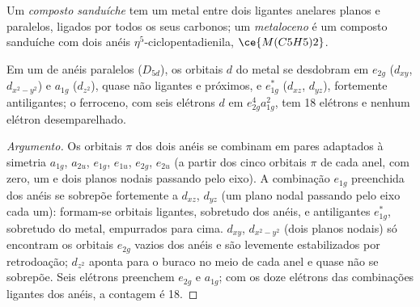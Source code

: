 \begin{definition}[Metalocenos]\label{def:b3:organometallic-bonding:metallocene}
Um \emph{composto sanduíche} tem um metal entre dois
ligantes anelares planos e paralelos, ligados por todos os seus carbonos; um
\emph{metaloceno} é um composto sanduíche com dois anéis
$\eta^5$-ciclopentadienila, $\ce{M(C5H5)2}$.
\end{definition}

\begin{proposition}\label{prop:b3:organometallic-bonding:ferrocene}
Em um  de anéis paralelos ($D_{5d}$), os orbitais $d$ do metal se desdobram em $e_{2g}$
($d_{xy}$, $d_{x^2-y^2}$) e $a_{1g}$ ($d_{z^2}$), quase não ligantes e próximos, e $e_{1g}^\ast$ ($d_{xz}$,
$d_{yz}$), fortemente antiligantes; o ferroceno, com seis elétrons $d$ em $e_{2g}^4a_{1g}^2$, tem 18
elétrons e nenhum elétron desemparelhado.
\end{proposition}

\begin{proof}[Argumento]
Os orbitais $\pi$ dos dois anéis se combinam em pares adaptados à simetria $a_{1g}$, $a_{2u}$,
$e_{1g}$, $e_{1u}$, $e_{2g}$, $e_{2u}$ (a partir dos cinco orbitais $\pi$ de cada anel, com zero, um e dois
planos nodais passando pelo eixo). A combinação $e_{1g}$ preenchida dos anéis se sobrepõe
fortemente a $d_{xz}$, $d_{yz}$ (um plano nodal passando pelo eixo cada um): formam-se orbitais
ligantes, sobretudo dos anéis, e antiligantes $e_{1g}^\ast$, sobretudo do metal, empurrados para cima. $d_{xy}$, $d_{x^2-y^2}$
(dois planos nodais) só encontram os orbitais $e_{2g}$ vazios dos anéis e são levemente
estabilizados por retrodoação; $d_{z^2}$ aponta para o buraco no meio de cada anel e
quase não se sobrepõe. Seis elétrons preenchem $e_{2g}$ e $a_{1g}$; com os doze elétrons das
combinações ligantes dos anéis, a contagem é 18.
\end{proof}

